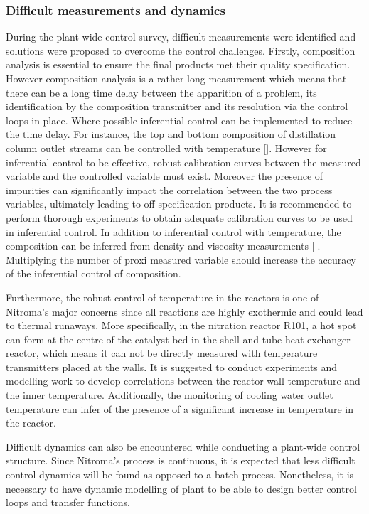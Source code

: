 \subsubsection{Difficult measurements and dynamics} %
During the plant-wide control survey, difficult measurements were identified and solutions were proposed to overcome the control challenges. Firstly, composition analysis is essential to ensure the final products met their quality specification. However composition analysis is a rather long measurement which means that there can be a long time delay between the apparition of a problem, its identification by the composition transmitter and its resolution via the control loops in place. Where possible inferential control can be implemented to reduce the time delay. For instance, the top and bottom composition of distillation column outlet streams can be controlled with temperature []. However for inferential control to be effective, robust calibration curves between the measured variable and the controlled variable must exist. Moreover the presence of impurities can significantly impact the correlation between the two process variables, ultimately leading to off-specification products. It is recommended to perform thorough experiments to obtain adequate calibration curves to be used in inferential control. In addition to inferential control with temperature, the composition can be inferred from density and viscosity measurements []. Multiplying the number of proxi measured variable should increase the accuracy of the inferential control of composition.

Furthermore, the robust control of temperature in the reactors is one of Nitroma's major concerns since all reactions are highly exothermic and could lead to thermal runaways. More specifically, in the nitration reactor R101, a hot spot can form at the centre of the catalyst bed in the shell-and-tube heat exchanger reactor, which means it can not be directly measured with temperature transmitters placed at the walls. It is suggested to conduct experiments and modelling work to develop correlations between the reactor wall temperature and the inner temperature. Additionally, the monitoring of cooling water outlet temperature can infer of the presence of a significant increase in temperature in the reactor.

Difficult dynamics can also be encountered while conducting a plant-wide control structure. Since Nitroma's process is continuous, it is expected that less difficult control dynamics will be found as opposed to a batch process. Nonetheless, it is necessary to have dynamic modelling of plant to be able to design better control loops and transfer functions.



